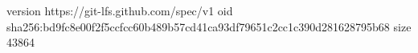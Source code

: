 version https://git-lfs.github.com/spec/v1
oid sha256:bd9fc8e00f2f5ccfcc60b489b57cd41ca93df79651c2cc1c390d281628795b68
size 43864
